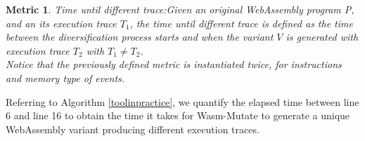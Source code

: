 \documentclass[a4paper,fleqn]{cas-dc}
\newcommand{\tool}{{\sc Wasm-Mutate}\xspace}
\newcommand{\Wasm}{WebAssembly\xspace}
\newcommand{\wasm}{\Wasm}
\newtheorem{metric}{Metric}
\begin{document}
\begin{metric}{Time until different trace:}\label{metric:mem:sha}
Given an original \wasm program P, and an its execution trace $T_1$, the time until different trace is defined as the time between the diversification process starts and when the variant $V$ is generated with execution trace $T_2$ with $T_1 \neq T_2$.
\\

Notice that the previously defined metric is instantiated twice, for instructions and memory type of events.

\end{metric}

Referring to Algorithm \ref{toolinpractice}, we quantify the elapsed time between line 6 and line 16 to obtain the time it takes for \tool to generate a unique \Wasm variant producing different execution traces.
\end{document}
